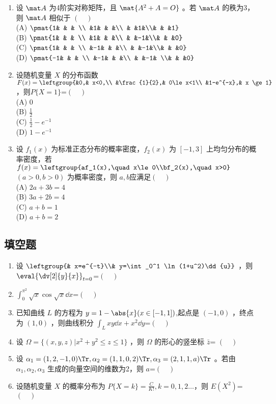 \begin{enumerate}
\item 设 $\mat A$ 为4阶实对称矩阵，且 $\mat {A^2+A=O}$  。若 $\mat A$ 的秩为3，则 $\mat A$  相似于 $(\quad )$\\
(A) $\pmat{1& & &  \\ &1& & &\\ & &1&\\& & &1}$\\
(B) $\pmat{1& & &  \\ &1& & &\\ & &-1&\\& & &0}$\\
(C) $\pmat{1& & &  \\ &-1& & &\\ & &-1&\\& & &0}$\\
(D) $\pmat{-1& & & \\ &-1& & &\\ & &-1& \\& & &0}$
\item  设随机变量 $X$ 的分布函数 $F(x)=\leftgroup{&0,& x<0,\\ &\frac{1}{2},& 0\le x<1\\ &1-e^{-x},& x \ge 1}$   ，则$P\{X=1\}$=$(\quad )$\\
(A)  $0$\\
(B) $\frac{1}{2}$\\
(C)  $\frac{1}{2}-e^{-1}$\\
(D) $1-e^{-1}$
\item  设 $f_1(x)$ 为标准正态分布的概率密度，$f_2(x)$   为 $[-1,3]$ 上均匀分布的概率密度，若 $f(x)=\leftgroup{af_1(x),\quad x\le0\\bf_2(x),\quad x>0}\quad $ $(a>0,b>0)$ 为概率密度，则 $a,b$应满足$(\quad )$\\
(A) $2a+3b=4$\\
(B)   $3a+2b=4$\\
(C)  $a+b=1$\\
(D)   $a+b=2$
\end{enumerate}
\subsection{填空题}
\begin{enumerate}
\item 设 $\leftgroup{& x=e^{-t}\\& y=\int_0^1 \ln(1+u^2)\dd{u}}$   ，则 $\displaystyle \eval{\dv[2]{y}{x}}_{t=0}$=$(\quad )$
\item $\int_0^{\pi^2}\sqrt{x}\cos \sqrt{x}\dd{x}$=$(\quad )$
\item  已知曲线 $L$ 的方程为 $y=1-\abs{x} (x \in [-1,1])$,起点是 $(-1,0)$ ，终点为 $(1,0)$ ，则曲线积分 $\displaystyle \int_L xy\dd{x}+x^2\dd{y}$=$(\quad )$
\item 设 $\Omega=\{(x,y,z)|x^2+y^2\le z \le1\}$ ，则 $\Omega$ 的形心的竖坐标 $\bar z$= $(\quad )$
\item 设 $\alpha_1=(1,2,-1,0)\Tr ,\alpha_2=(1,1,0,2)\Tr ,\alpha_3=(2,1,1,a)\Tr $  。若由 $\alpha_1,\alpha_2,\alpha_3$  生成的向量空间的维数为2，则  $a$=$(\quad )$
\item  设随机变量 $X$  的概率分布为 $P\{X=k\}=\frac{C}{K!},k=0,1,2\dots$，则 $E(X^2)$=$(\quad )$
\end{enumerate}
